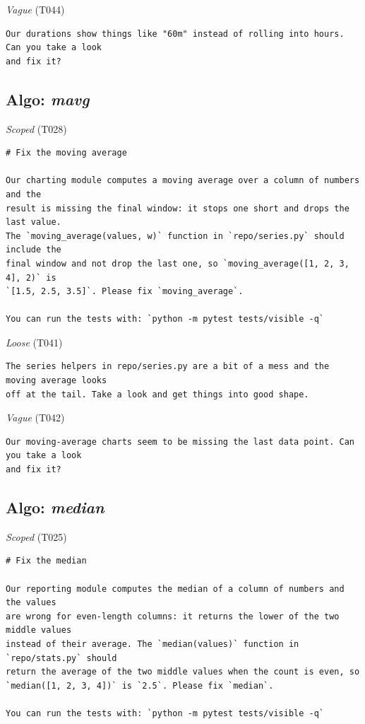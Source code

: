 \noindent\textit{Vague} (T044)
\begin{Verbatim}[fontsize=\footnotesize,frame=leftline,xleftmargin=1em]
Our durations show things like "60m" instead of rolling into hours. Can you take a look
and fix it?
\end{Verbatim}

\subsection*{Algo: \emph{mavg}}
\noindent\textit{Scoped} (T028)
\begin{Verbatim}[fontsize=\footnotesize,frame=leftline,xleftmargin=1em]
# Fix the moving average

Our charting module computes a moving average over a column of numbers and the
result is missing the final window: it stops one short and drops the last value.
The `moving_average(values, w)` function in `repo/series.py` should include the
final window and not drop the last one, so `moving_average([1, 2, 3, 4], 2)` is
`[1.5, 2.5, 3.5]`. Please fix `moving_average`.

You can run the tests with: `python -m pytest tests/visible -q`
\end{Verbatim}

\noindent\textit{Loose} (T041)
\begin{Verbatim}[fontsize=\footnotesize,frame=leftline,xleftmargin=1em]
The series helpers in repo/series.py are a bit of a mess and the moving average looks
off at the tail. Take a look and get things into good shape.
\end{Verbatim}

\noindent\textit{Vague} (T042)
\begin{Verbatim}[fontsize=\footnotesize,frame=leftline,xleftmargin=1em]
Our moving-average charts seem to be missing the last data point. Can you take a look
and fix it?
\end{Verbatim}

\subsection*{Algo: \emph{median}}
\noindent\textit{Scoped} (T025)
\begin{Verbatim}[fontsize=\footnotesize,frame=leftline,xleftmargin=1em]
# Fix the median

Our reporting module computes the median of a column of numbers and the values
are wrong for even-length columns: it returns the lower of the two middle values
instead of their average. The `median(values)` function in `repo/stats.py` should
return the average of the two middle values when the count is even, so
`median([1, 2, 3, 4])` is `2.5`. Please fix `median`.

You can run the tests with: `python -m pytest tests/visible -q`
\end{Verbatim}

